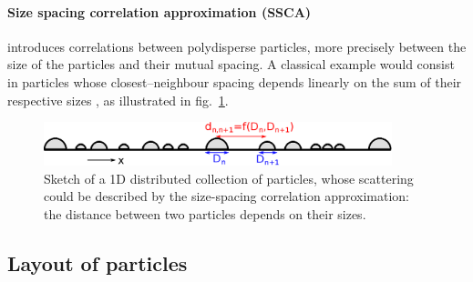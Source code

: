 \paragraph{Size spacing correlation approximation (SSCA)} introduces correlations between polydisperse particles, more precisely between the size of the particles and their mutual spacing. A classical example would consist in particles whose closest--neighbour spacing depends linearly on the sum of their respective sizes \cite{LaLe07}, as illustrated in fig.~\ref{fig:ssca}.


\begin{figure}[ht]
\begin{center}
\includegraphics[width=0.9\textwidth]{Figures/drawing/drawingSSCA.eps}
\end{center}
\caption{Sketch of a 1D distributed collection of particles, whose scattering could be described by the size-spacing correlation approximation: the distance between two particles depends on their sizes.}
\label{fig:ssca}
\end{figure}




\subsection{Layout of particles}\label{sec:partlayout}

